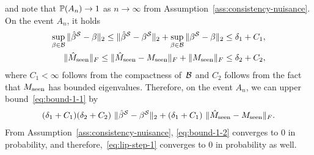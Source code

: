 and note that $\mathbb{P}(A_n) \to 1$ as $n \to \infty$ from Assumption~\ref{ass:consistency-nuisance}.
On the event $A_n$, it holds
\begin{align*}
    \sup_{\beta \in \mathcal{B}} \|\hat{\beta}^{\mathcal{S}} - \beta\|_2 \leq \|\hat{\beta}^{\mathcal{S}} - \beta^{\mathcal{S}}\|_2 + \sup_{\beta \in \mathcal{B}}  \|\beta^{\mathcal{S}} - \beta\|_2 \leq \delta_1 + C_1,\\
    \|\hat{M}_{\mathrm{seen}}\|_F \leq \|\hat{M}_{\mathrm{seen}} - M_{\mathrm{seen}}\|_F + \|M_{\mathrm{seen}}\|_F \leq \delta_2 +  C_2,   
\end{align*}
where $C_1 < \infty$ follows from the compactness of~$\mathcal{B}$ and $C_2$ follows from the fact that  $M_{\mathrm{seen}}$ has bounded eigenvalues.
Therefore, on the event $A_n$, we can upper bound~\eqref{eq:bound-1-1} by
\begin{align}
    (\delta_1 + C_1) (\delta_2 + C_2)\ \|\hat{\beta}^{\mathcal{S}} - \beta^{\mathcal{S}}\|_2 + (\delta_1 + C_1)\ \|\hat{M}_{\mathrm{seen}} - M_{\mathrm{seen}}\|_F.\label{eq:bound-1-2} 
\end{align}
From Assumption~\ref{ass:consistency-nuisance}, \eqref{eq:bound-1-2} converges to 0 in probability, and therefore,~\eqref{eq:lip-step-1} converges to 0 in probability as well.

